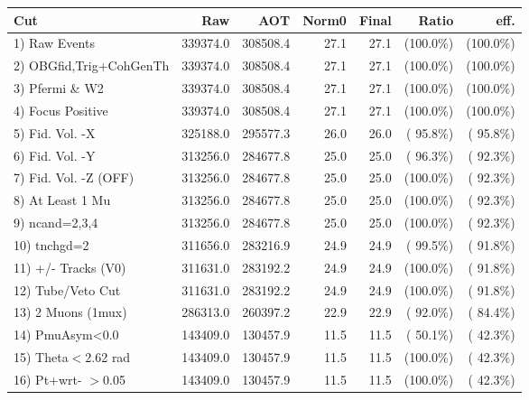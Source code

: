  \begin{table}[h!]\centering
 \begin{tabular}{||l||r|r|r|r|r|r||}
 \hline
 \hline
 Cut & Raw & AOT & Norm0 & Final & Ratio & eff.       \\
 \hline
  1) Raw Events           &     339374.0 &     308508.4 &         27.1 &         27.1 & (100.0\%) & (100.0\%) \\
  2) OBGfid,Trig+CohGenTh &     339374.0 &     308508.4 &         27.1 &         27.1 & (100.0\%) & (100.0\%) \\
  3) Pfermi \& W2         &     339374.0 &     308508.4 &         27.1 &         27.1 & (100.0\%) & (100.0\%) \\
  4) Focus Positive       &     339374.0 &     308508.4 &         27.1 &         27.1 & (100.0\%) & (100.0\%) \\
  5) Fid. Vol. -X         &     325188.0 &     295577.3 &         26.0 &         26.0 & ( 95.8\%) & ( 95.8\%) \\
  6) Fid. Vol. -Y         &     313256.0 &     284677.8 &         25.0 &         25.0 & ( 96.3\%) & ( 92.3\%) \\
  7) Fid. Vol. -Z (OFF)   &     313256.0 &     284677.8 &         25.0 &         25.0 & (100.0\%) & ( 92.3\%) \\
  8) At Least 1 Mu        &     313256.0 &     284677.8 &         25.0 &         25.0 & (100.0\%) & ( 92.3\%) \\
  9) ncand=2,3,4          &     313256.0 &     284677.8 &         25.0 &         25.0 & (100.0\%) & ( 92.3\%) \\
 10) tnchgd=2             &     311656.0 &     283216.9 &         24.9 &         24.9 & ( 99.5\%) & ( 91.8\%) \\
 11) +/- Tracks (V0)      &     311631.0 &     283192.2 &         24.9 &         24.9 & (100.0\%) & ( 91.8\%) \\
 12) Tube/Veto Cut        &     311631.0 &     283192.2 &         24.9 &         24.9 & (100.0\%) & ( 91.8\%) \\
 13) 2 Muons (1mux)       &     286313.0 &     260397.2 &         22.9 &         22.9 & ( 92.0\%) & ( 84.4\%) \\
 14) PmuAsym<0.0          &     143409.0 &     130457.9 &         11.5 &         11.5 & ( 50.1\%) & ( 42.3\%) \\
 15) Theta$<$2.62 rad     &     143409.0 &     130457.9 &         11.5 &         11.5 & (100.0\%) & ( 42.3\%) \\
 16) Pt+wrt- $>$0.05      &     143409.0 &     130457.9 &         11.5 &         11.5 & (100.0\%) & ( 42.3\%) \\

\end{tabular}
\end{table}
